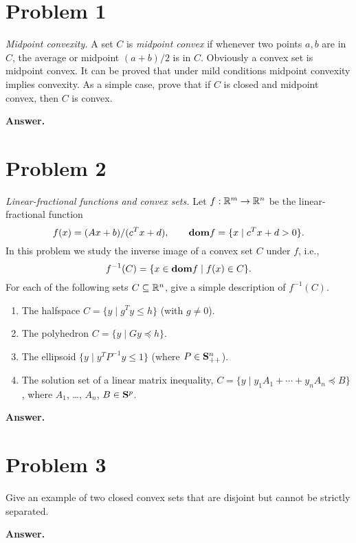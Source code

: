 \section*{Problem 1} \label{ex-midpoint-cvx}
\emph{Midpoint convexity.}
A set $C$ is \emph{midpoint convex} if whenever two points $a,b$ are in $C$, the average or midpoint $(a+b)/2$ is in $C$.  Obviously a convex set is midpoint convex. It can be proved that under mild conditions midpoint convexity implies convexity. As a simple case, prove that if $C$ is closed and midpoint convex, then $C$ is convex.

{\bf{Answer.}}


\section*{Problem 2}\label{e-lin-frac-image}%
\emph{Linear-fractional functions and convex sets.}
Let $f:{\mathbb{R}}^m \rightarrow {\mathbb{R}}^n$ be the linear-fractional function
\[
f(x) = (Ax+b)/(c^T x+ d), \qquad {\bf{dom}} f = \{x \;|\; c^Tx+d >0\}.
\]
In this problem we study the inverse image of a convex set $C$ under $f$, i.e.,
\[
f^{-1} (C) = \{ x \in {\bf{dom}} f \;|\; f(x) \in C \}.
\]
For each of the following sets $C\subseteq {\mathbb{R}}^n$, give a simple
description of $f^{-1}(C)$.

\begin{enumerate}
\item The halfspace $C = \{ y \; | \; g^Ty \leqslant h\}$ (with $g\neq 0$).

\item The polyhedron $C = \{y \; | \; Gy \preceq h\}$.

\item The ellipsoid $\{ y \;|\; y^T P^{-1} y \leqslant 1 \}$ (where $P \in {\bf{S}}^n_{++}$).

\item The solution set of a linear matrix inequality, $C = \{y\; |\; y_1 A_1+ \cdots + y_n A_n \preceq B\}$, where $A_1$, \ldots, $A_n$, $B \in {\bf{S}}^p$.
\end{enumerate}

{\bf{Answer.}}

\section*{Problem 3}\label{exe-sep-hyp-strict-counterexample}
Give an example of two closed convex sets that are disjoint but cannot be strictly separated.

{\bf{Answer.}}


